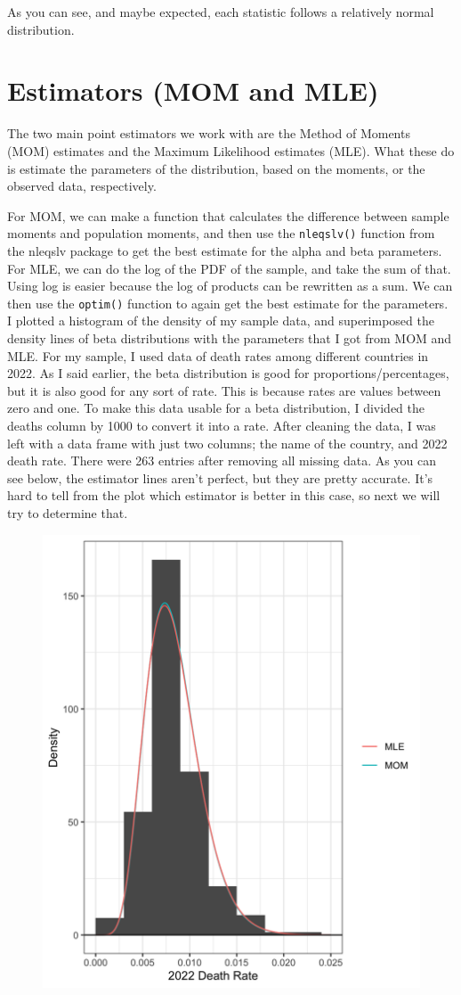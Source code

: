 \documentclass{article}\usepackage[]{graphicx}\usepackage[]{xcolor}
\begin{document}
\begin{multicols}{2}
As you can see, and maybe expected, each statistic follows a relatively normal distribution.
\section{Estimators (MOM and MLE)}
The two main point estimators we work with are the Method of Moments (MOM) estimates and the Maximum Likelihood estimates (MLE). What these do is estimate the parameters of the distribution, based on the moments, or the observed data, respectively.

For MOM, we can make a function that calculates the difference between sample moments and population moments, and then use the \texttt{nleqslv()} function from the nleqslv \citep{nleqslv} package to get the best estimate for the alpha and beta parameters. For MLE, we can do the log of the PDF of the sample, and take the sum of that. Using log is easier because the log of products can be rewritten as a sum. We can then use the \texttt{optim()} function to again get the best estimate for the parameters.
I plotted a histogram of the density of my sample data, and superimposed the density lines of beta distributions with the parameters that I got from MOM and MLE. For my sample, I used data of death rates among different countries in 2022. As I said earlier, the beta distribution is good for proportions/percentages, but it is also good for any sort of rate. This is because rates are values between zero and one. To make this data usable for a beta distribution, I divided the deaths column by 1000 to convert it into a rate. After cleaning the data, I was left with a data frame with just two columns; the name of the country, and 2022 death rate. There were 263 entries after removing all missing data. 
As you can see below, the estimator lines aren't perfect, but they are pretty accurate. It's hard to tell from the plot which estimator is better in this case, so next we will try to determine that.
\begin{figure}[H]
  \centering
  \includegraphics[width=0.7\linewidth]{estimators.png}

\end{figure}
\end{multicols}
\end{document}
